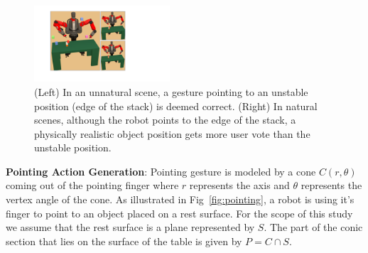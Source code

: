 \begin{figure}[h!]
    \centering
    \includegraphics[width=0.45\textwidth]{natural.pdf}
    \caption{(Left) In an unnatural scene, a gesture pointing to an unstable position (edge of the stack) is deemed correct. (Right) In natural scenes, although the robot points to the edge of the stack, a physically realistic object position gets more user vote than the unstable position.}
    \label{fig:natural}
\end{figure}




\noindent\textbf{Pointing Action Generation}: Pointing gesture is modeled by a cone $C(r, \theta)$ coming out of the pointing finger where $r$ represents the axis and $\theta$ represents the vertex angle of the cone. As illustrated in Fig~\ref{fig:pointing}, a robot is using it's finger to point to an object placed on a rest surface. For the scope of this study we assume that the rest surface is a plane represented by $S$. The part of the conic section that lies on the surface of the table is given by $P=C \cap S$.

